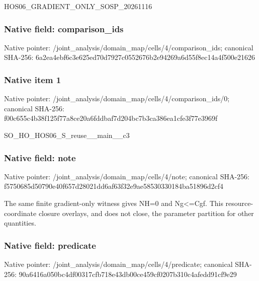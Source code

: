 \documentclass[10pt,a4paper]{article}
\begin{document}
\begingroup\raggedright\sloppy HOS06\_\allowbreak{}GRADIENT\_\allowbreak{}ONLY\_\allowbreak{}SOSP\_\allowbreak{}20261116\par\endgroup

\subsubsection{Native field: comparison\_\allowbreak{}ids}
Native pointer: /joint\_\allowbreak{}analysis/domain\_\allowbreak{}map/cells/4/comparison\_\allowbreak{}ids; canonical SHA-256: 6a2ea4ebf6c3e625ed70d7927c0552676b2e94269a6d55f8ec14a4f500e21626

\subsubsection{Native item 1}
Native pointer: /joint\_\allowbreak{}analysis/domain\_\allowbreak{}map/cells/4/comparison\_\allowbreak{}ids/0; canonical SHA-256: f00c655c4b38f125f77a8ce20a6fddbaf7d204bc7b3ca386ea1cfe3f77e3969f

\begingroup\raggedright\sloppy SO\_\allowbreak{}HO\_\allowbreak{}HOS06\_\allowbreak{}S\_\allowbreak{}reuse\_\allowbreak{}\_\allowbreak{}main\_\allowbreak{}\_\allowbreak{}c3\par\endgroup

\subsubsection{Native field: note}
Native pointer: /joint\_\allowbreak{}analysis/domain\_\allowbreak{}map/cells/4/note; canonical SHA-256: f5750685d50790e40f657d28021dd6af63f32e9ae58530330184ba51896d2cf4

\begingroup\raggedright\sloppy The same finite gradient-only witness gives NH=\allowbreak{}0 and Ng<=\allowbreak{}Cgf. This resource-coordinate closure overlays,\allowbreak{} and does not close,\allowbreak{} the parameter partition for other quantities.\par\endgroup

\subsubsection{Native field: predicate}
Native pointer: /joint\_\allowbreak{}analysis/domain\_\allowbreak{}map/cells/4/predicate; canonical SHA-256: 90a6416a050bc4df00317cfb718e43db00ce459cf0207b310c4afedd91cf9e29
\end{document}
